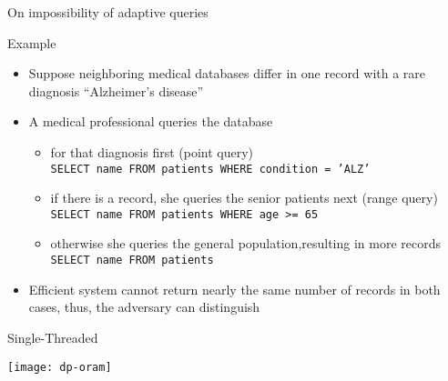 	\begin{frame}{On impossibility of adaptive queries}

		\begin{block}{Example}
			\justify%

			\begin{itemize}
				\item Suppose neighboring medical databases differ in one record with a rare diagnosis ``Alzheimer's disease''
				\item A medical professional queries the database
				\begin{itemize}
					\item
						for that diagnosis first (point query) \\
						\texttt{SELECT name FROM patients WHERE condition = 'ALZ'} %

					\item
						if there is a record, she queries the senior patients next (range query) \\
						\texttt{SELECT name FROM patients WHERE age >= 65}

					\item
						otherwise she queries the general population,resulting in more records \\
						\texttt{SELECT name FROM patients}
				\end{itemize}
				\item Efficient system cannot return nearly the same number of records in both cases, thus, the adversary can distinguish
			\end{itemize}

		\end{block}

	\end{frame}

	\begin{frame}{Single-Threaded \epsolute{}}

		\centering
		\texttt{[image: dp-oram]}

	\end{frame}

